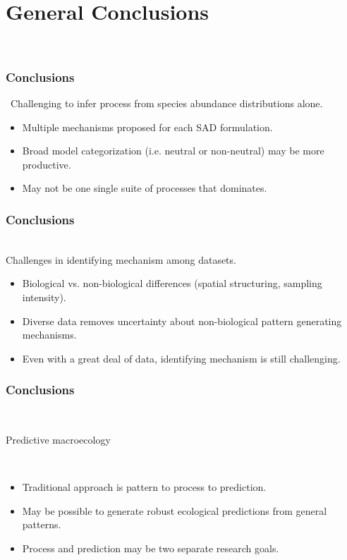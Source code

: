 \documentclass[14pt]{beamer}
\begin{document}
\section{General Conclusions}
\begin{frame}{}
~\\ 
\frametitle{Conclusions}\
Challenging to infer process from species abundance distributions alone.
~\\ 
\begin{itemize}
\item Multiple mechanisms proposed for each SAD formulation.
\item Broad model categorization (i.e. neutral or non-neutral) may be more productive.
\item May not be one single suite of processes that dominates.
\end{itemize} 
\end{frame}

\begin{frame}[t]{}
\frametitle{Conclusions}\
~\\ 
Challenges in identifying mechanism among datasets.
~\\ 
\begin{itemize}
\item Biological vs. non-biological differences (spatial structuring, sampling intensity).
\item Diverse data removes uncertainty about non-biological pattern generating mechanisms.
\item Even with a great deal of data, identifying mechanism is still challenging.
\end{itemize} 
\end{frame}

\begin{frame}[t]{}
\frametitle{Conclusions}\
~\\ 
\begin{large}
Predictive macroecology
\end{large}
~\\ 
\begin{itemize}
\item Traditional approach is pattern to process to prediction.
\item May be possible to generate robust ecological predictions from general patterns.
\item Process and prediction may be two separate research goals.
\end{itemize} 
\end{frame}
\end{document}
